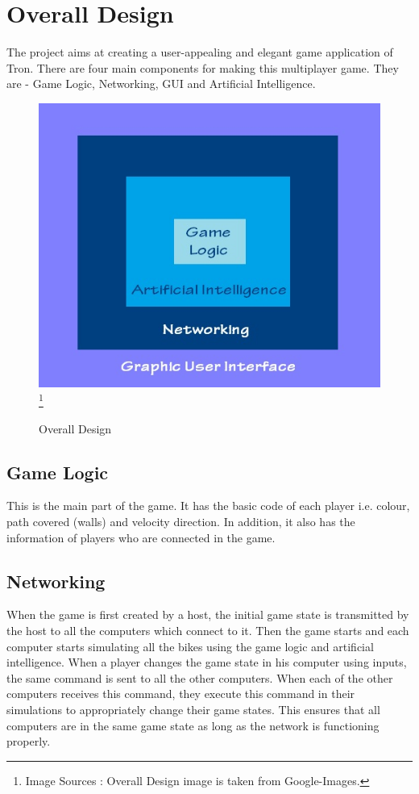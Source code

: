\documentclass[14 pt]{article}
\begin{document}
\section{Overall Design}
    The project aims at creating a user-appealing and elegant game application of Tron. There are four main components for making this multiplayer game. They are - Game Logic, Networking, GUI and Artificial Intelligence.\\

\begin{figure}[h!]
\centering
\includegraphics[width =100 mm]{5.jpg}
\footnote{Image Sources : Overall Design image is taken from Google-Images.}\\
\caption{Overall Design}
\end{figure}

\subsection{Game Logic}
    This is the main part of the game. It has the basic code of each player i.e. colour, path covered (walls) and velocity direction. In addition, it also has the information of players who are connected in the game.\\

\subsection{Networking}
    When the game is first created by a host, the initial game state is transmitted by the host to all the computers which connect to it. Then the game starts and each computer starts simulating all the bikes using the game logic and artificial intelligence. When a player changes the game state in his computer using inputs, the same command is sent to all the other computers. When each of the other computers receives this command, they execute this command in their simulations to appropriately change their game states. This ensures that all computers are in the same game state as long as the network is functioning properly.\\
    
\end{document}
